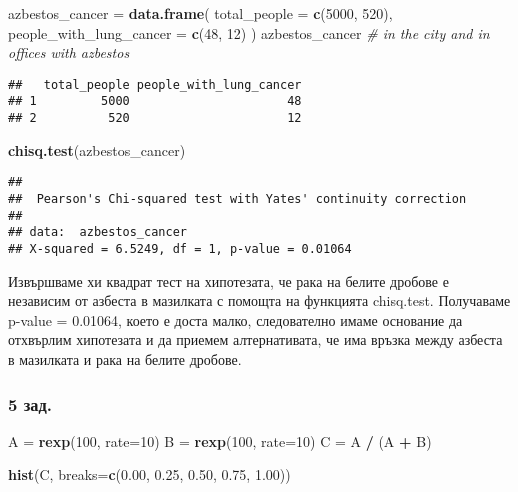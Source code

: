 \documentclass[]{article}
\newenvironment{Shaded}{\begin{snugshade}}{\end{snugshade}}
\newcommand{\KeywordTok}[1]{\textcolor[rgb]{0.13,0.29,0.53}{\textbf{#1}}}
\newcommand{\DataTypeTok}[1]{\textcolor[rgb]{0.13,0.29,0.53}{#1}}
\newcommand{\DecValTok}[1]{\textcolor[rgb]{0.00,0.00,0.81}{#1}}
\newcommand{\FloatTok}[1]{\textcolor[rgb]{0.00,0.00,0.81}{#1}}
\newcommand{\StringTok}[1]{\textcolor[rgb]{0.31,0.60,0.02}{#1}}
\newcommand{\CommentTok}[1]{\textcolor[rgb]{0.56,0.35,0.01}{\textit{#1}}}
\newcommand{\OperatorTok}[1]{\textcolor[rgb]{0.81,0.36,0.00}{\textbf{#1}}}
\newcommand{\NormalTok}[1]{#1}
\begin{document}
\begin{Shaded}
\begin{Highlighting}[]
\NormalTok{azbestos_cancer =}\StringTok{ }\KeywordTok{data.frame}\NormalTok{(}
    \DataTypeTok{total_people =} \KeywordTok{c}\NormalTok{(}\DecValTok{5000}\NormalTok{, }\DecValTok{520}\NormalTok{),}
    \DataTypeTok{people_with_lung_cancer =} \KeywordTok{c}\NormalTok{(}\DecValTok{48}\NormalTok{, }\DecValTok{12}\NormalTok{)}
\NormalTok{)}
\NormalTok{azbestos_cancer }\CommentTok{# in the city and in offices with azbestos}
\end{Highlighting}
\end{Shaded}

\begin{verbatim}
##   total_people people_with_lung_cancer
## 1         5000                      48
## 2          520                      12
\end{verbatim}

\begin{Shaded}
\begin{Highlighting}[]
\KeywordTok{chisq.test}\NormalTok{(azbestos_cancer)}
\end{Highlighting}
\end{Shaded}

\begin{verbatim}
## 
##  Pearson's Chi-squared test with Yates' continuity correction
## 
## data:  azbestos_cancer
## X-squared = 6.5249, df = 1, p-value = 0.01064
\end{verbatim}

Извършваме хи квадрат тест на хипотезата, че рака на белите дробове е
независим от азбеста в мазилката с помощта на функцията chisq.test.
Получаваме p-value = 0.01064, което е доста малко, следователно имаме
основание да отхвърлим хипотезата и да приемем алтернативата, че има
връзка между азбеста в мазилката и рака на белите дробове.

\subsubsection{5 зад.}\label{.-4}

\begin{Shaded}
\begin{Highlighting}[]
\NormalTok{A =}\StringTok{ }\KeywordTok{rexp}\NormalTok{(}\DecValTok{100}\NormalTok{, }\DataTypeTok{rate=}\DecValTok{10}\NormalTok{)}
\NormalTok{B =}\StringTok{ }\KeywordTok{rexp}\NormalTok{(}\DecValTok{100}\NormalTok{, }\DataTypeTok{rate=}\DecValTok{10}\NormalTok{)}
\NormalTok{C =}\StringTok{ }\NormalTok{A }\OperatorTok{/}\StringTok{ }\NormalTok{(A }\OperatorTok{+}\StringTok{ }\NormalTok{B)}

\KeywordTok{hist}\NormalTok{(C, }\DataTypeTok{breaks=}\KeywordTok{c}\NormalTok{(}\FloatTok{0.00}\NormalTok{, }\FloatTok{0.25}\NormalTok{, }\FloatTok{0.50}\NormalTok{, }\FloatTok{0.75}\NormalTok{, }\FloatTok{1.00}\NormalTok{))}
\end{Highlighting}
\end{Shaded}
\end{document}
